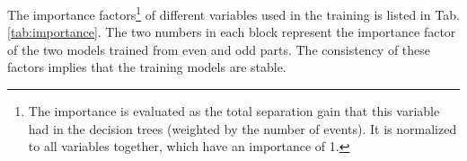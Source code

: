 

The importance factors\footnote{
The importance is evaluated as the total separation gain that this variable had in the decision trees (weighted by the number of events). It is normalized to all variables together, which have an importance of 1.
}
of different variables used in the training is listed in Tab. \ref{tab:importance}. The two numbers in each block represent the importance factor of the two models trained from even and odd parts. The consistency of these factors implies that the training models are stable.


